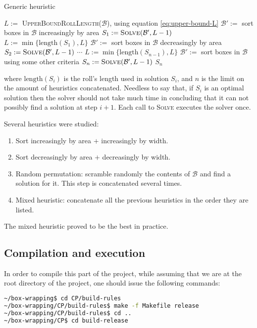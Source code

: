 \begin{algorithm}[H]
	\label{alg:constraint:programming:generic-heuristic}
	\DontPrintSemicolon
    
	\caption{Generic heuristic}
    
	$L := $ \textsc{UpperBoundRollLength}($\mathcal{B}$), using equation \ref{eq:upper-bound-L} \;
	$\mathcal{B}' :=$ sort boxes in $\mathcal{B}$ increasingly by area \;
	$S_1 := \textsc{Solve}(\mathcal{B}', L - 1)$ \;
	\;
	$L := \min\{ \text{length}(S_1), L \}$ \;
	$\mathcal{B}' :=$ sort boxes in $\mathcal{B}$ decreasingly by area \;
	$S_2 := \textsc{Solve}(\mathcal{B}', L - 1)$ \;
	\;
	$\cdots$ \;
	\;
	$L := \min\{ \text{length}(S_{n-1}), L \}$ \;
	$\mathcal{B}' :=$ sort boxes in $\mathcal{B}$ using some other criteria \;
	$S_n := \textsc{Solve}(\mathcal{B}', L - 1)$ \;
	\Return $S_n$
\end{algorithm}

\hfill

where $\text{length}(S_i)$ is the roll's length used in solution $S_i$, and $n$ is
the limit on the amount of heuristics concatenated. Needless to say that, if $S_i$
is an optimal solution then the solver should not take much time in concluding that
it can not possibly find a solution at step $i+1$. Each call to \textsc{Solve}
executes the solver once.

\hfill

Several heuristics were studied:
\begin{enumerate}
	\item Sort increasingly by area $+$ increasingly by width.
	\item Sort decreasingly by area $+$ decreasingly by width.
	\item Random permutation: scramble randomly the contents of $\mathcal{B}$
	and find a solution for it. This step is concatenated several times.
	\item Mixed heuristic: concatenate all the previous heuristics in the order
	they are listed.
\end{enumerate}

The mixed heuristic proved to be the best in practice.

\subsection{Compilation and execution}
\label{sec:constraint-programming:compilation-execution}

In order to compile this part of the project, while assuming that we are at the
root directory of the project, one should issue the following commands:
\begin{lstlisting}[language=bash]
~/box-wrapping$ cd CP/build-rules
~/box-wrapping/CP/build-rules$ make -f Makefile release
~/box-wrapping/CP/build-rules$ cd ..
~/box-wrapping/CP$ cd build-release
\end{lstlisting}

